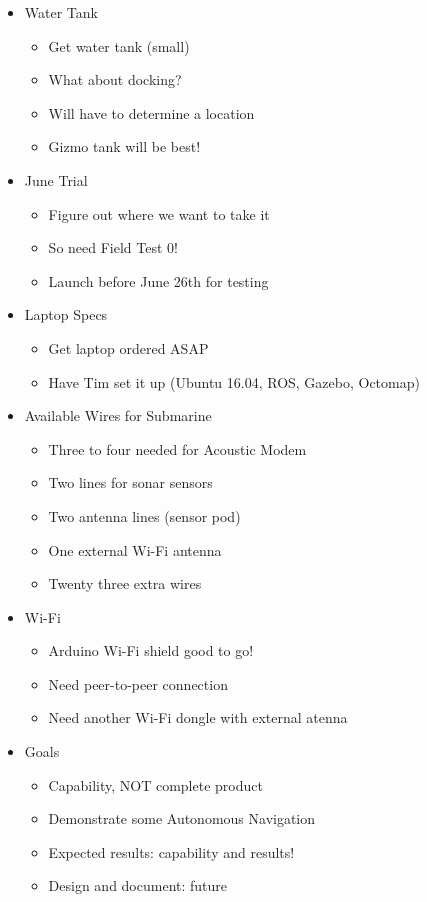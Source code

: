 \documentclass[12pt]{article}
\begin{document}
\begin{itemize}
\begin{itemize}
			\end{itemize}
			\item Water Tank
			\begin{itemize}
				\item Get water tank (small)
				\item What about docking?
				\item Will have to determine a location 
				\item Gizmo tank will be best!
			\end{itemize}
			\item June Trial
			\begin{itemize}
				\item Figure out where we want to take it
				\item So need Field Test 0!
				\item Launch before June 26th for testing
			\end{itemize}
			\item Laptop Specs
			\begin{itemize}
				\item Get laptop ordered ASAP
				\item Have Tim set it up (Ubuntu 16.04, ROS, Gazebo, Octomap)
			\end{itemize}
			\item Available Wires for Submarine
			\begin{itemize}
				\item Three to four needed for Acoustic Modem
				\item Two lines for sonar sensors
				\item Two antenna lines (sensor pod)
				\item One external Wi-Fi antenna
				\item Twenty three extra wires
			\end{itemize}
			\item Wi-Fi
			\begin{itemize}
				\item Arduino Wi-Fi shield good to go!
				\item Need peer-to-peer connection
				\item Need another Wi-Fi dongle with external atenna
			\end{itemize}
			\item Goals
			\begin{itemize}
				\item Capability, NOT complete product
				\item Demonstrate some Autonomous Navigation
				\item Expected results: capability and results! 
				\item Design and document: future
			\end{itemize}
		\end{itemize}
	
\end{document}
